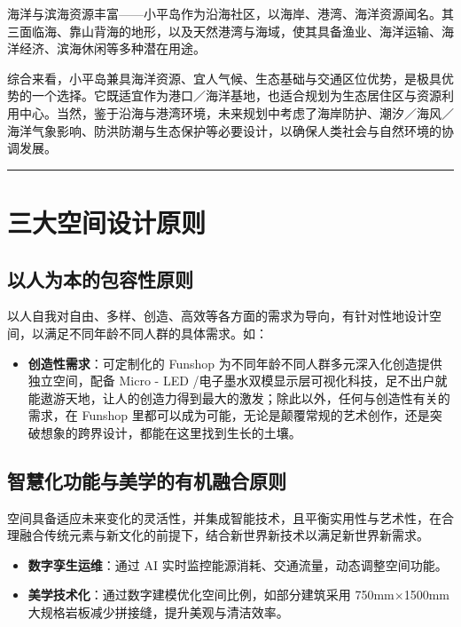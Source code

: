 海洋与滨海资源丰富------小平岛作为沿海社区，以海岸、港湾、海洋资源闻名。其三面临海、靠山背海的地形，以及天然港湾与海域，使其具备渔业、海洋运输、海洋经济、滨海休闲等多种潜在用途。

综合来看，小平岛兼具海洋资源、宜人气候、生态基础与交通区位优势，是极具优势的一个选择。它既适宜作为港口／海洋基地，也适合规划为生态居住区与资源利用中心。当然，鉴于沿海与港湾环境，未来规划中考虑了海岸防护、潮汐／海风／海洋气象影响、防洪防潮与生态保护等必要设计，以确保人类社会与自然环境的协调发展。

\begin{center}\rule{0.5\linewidth}{0.5pt}\end{center}

\section{三大空间设计原则}\label{ux4e09ux5927ux7a7aux95f4ux8bbeux8ba1ux539fux5219}

\subsection{以人为本的包容性原则}\label{ux4ee5ux4ebaux4e3aux672cux7684ux5305ux5bb9ux6027ux539fux5219}

以人自我对自由、多样、创造、高效等各方面的需求为导向，有针对性地设计空间，以满足不同年龄不同人群的具体需求。如：

\begin{itemize}
\tightlist
\item
  \textbf{创造性需求}：可定制化的 Funshop 为不同年龄不同人群多元深入化创造提供独立空间，配备 Micro - LED /电子墨水双模显示层可视化科技，足不出户就能遨游天地，让人的创造力得到最大的激发；除此以外，任何与创造性有关的需求，在 Funshop 里都可以成为可能，无论是颠覆常规的艺术创作，还是突破想象的跨界设计，都能在这里找到生长的土壤。
\end{itemize}

\subsection{智慧化功能与美学的有机融合原则}\label{ux667aux6167ux5316ux529fux80fdux4e0eux7f8eux5b66ux7684ux6709ux673aux878dux5408ux539fux5219}

空间具备适应未来变化的灵活性，并集成智能技术，且平衡实用性与艺术性，在合理融合传统元素与新文化的前提下，结合新世界新技术以满足新世界新需求。

\begin{itemize}
\item
  \textbf{数字孪生运维}：通过 AI 实时监控能源消耗、交通流量，动态调整空间功能。
\item
  \textbf{美学技术化}：通过数字建模优化空间比例，如部分建筑采用 750mm×1500mm 大规格岩板减少拼接缝，提升美观与清洁效率。
\end{itemize}

